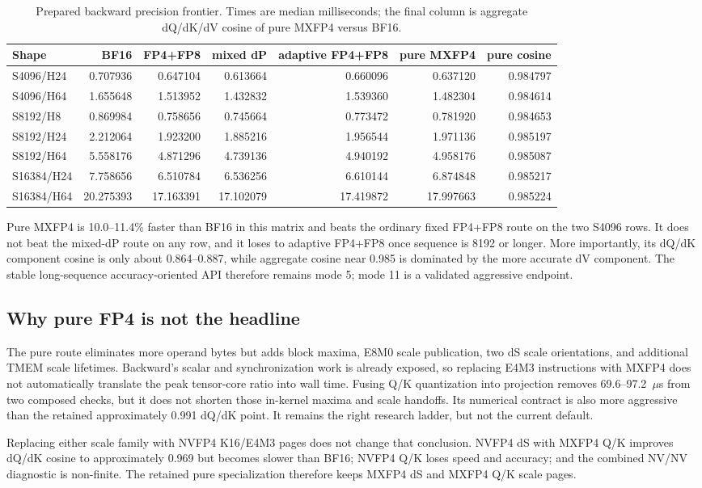 \begin{table}[htbp]
\centering
\caption{Prepared backward precision frontier.  Times are median milliseconds;
the final column is aggregate dQ/dK/dV cosine of pure MXFP4 versus BF16.}
\label{tab:pure-mxfp4-broad}
\scriptsize
\begin{tabular}{l rrrrr r}
\toprule
Shape & BF16 & FP4+FP8 & mixed dP & adaptive FP4+FP8 & pure MXFP4 & pure cosine \\
\midrule
S4096/H24  & 0.707936 & 0.647104 & 0.613664 & 0.660096 & 0.637120 & 0.984797 \\
S4096/H64  & 1.655648 & 1.513952 & 1.432832 & 1.539360 & 1.482304 & 0.984614 \\
S8192/H8   & 0.869984 & 0.758656 & 0.745664 & 0.773472 & 0.781920 & 0.984653 \\
S8192/H24  & 2.212064 & 1.923200 & 1.885216 & 1.956544 & 1.971136 & 0.985197 \\
S8192/H64  & 5.558176 & 4.871296 & 4.739136 & 4.940192 & 4.958176 & 0.985087 \\
S16384/H24 & 7.758656 & 6.510784 & 6.536256 & 6.610144 & 6.874848 & 0.985217 \\
S16384/H64 & 20.275393 & 17.163391 & 17.102079 & 17.419872 & 17.997663 & 0.985224 \\
\bottomrule
\end{tabular}
\end{table}

Pure MXFP4 is 10.0--11.4\% faster than BF16 in this matrix and beats the
ordinary fixed FP4+FP8 route on the two S4096 rows.  It does not beat the
mixed-dP route on any row, and it loses to adaptive FP4+FP8 once sequence is
8192 or longer.  More importantly, its dQ/dK component cosine is only about
0.864--0.887, while aggregate cosine near 0.985 is dominated by the more
accurate dV component.  The stable long-sequence accuracy-oriented API
therefore remains mode 5; mode 11 is a validated aggressive endpoint.

\subsection{Why pure FP4 is not the headline}

The pure route eliminates more operand bytes but adds block maxima, E8M0 scale
publication, two dS scale orientations, and additional TMEM scale lifetimes.
Backward's scalar and synchronization work is already exposed, so replacing
E4M3 instructions with MXFP4 does not automatically translate the peak
tensor-core ratio into wall time.  Fusing Q/K quantization into projection
removes 69.6--97.2~$\mu$s from two composed checks, but it does not shorten
those in-kernel maxima and scale handoffs.  Its numerical contract is also
more aggressive than the retained approximately 0.991 dQ/dK point.  It
remains the right research ladder, but not the current default.

Replacing either scale family with NVFP4 K16/E4M3 pages does not change that
conclusion.  NVFP4 dS with MXFP4 Q/K improves dQ/dK cosine to approximately
0.969 but becomes slower than BF16; NVFP4 Q/K loses speed and accuracy; and
the combined NV/NV diagnostic is non-finite.  The retained pure specialization
therefore keeps MXFP4 dS and MXFP4 Q/K scale pages.
